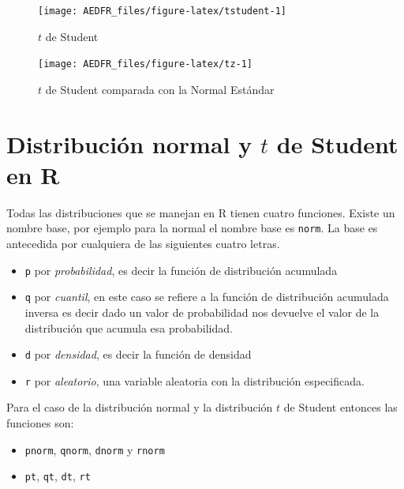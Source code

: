 \documentclass[letterpaper,]{book}
\providecommand{\tightlist}{%
  \setlength{\itemsep}{0pt}\setlength{\parskip}{0pt}}
\begin{document}
\begin{figure}[h!]

{\centering \texttt{[image: AEDFR\_files/figure-latex/tstudent-1]} 

}

\caption{$t$ de Student}\label{fig:tstudent}
\end{figure}

\begin{figure}[h!]

{\centering \texttt{[image: AEDFR\_files/figure-latex/tz-1]} 

}

\caption{$t$ de Student comparada con la Normal Estándar}\label{fig:tz}
\end{figure}

\hypertarget{distribucion-normal-y-t-de-student-en-r}{%
\section{\texorpdfstring{Distribución normal y \(t\) de Student en R}{Distribución normal y t de Student en R}}\label{distribucion-normal-y-t-de-student-en-r}}

Todas las distribuciones que se manejan en R tienen cuatro funciones. Existe un nombre base, por ejemplo para la normal el nombre base es \texttt{norm}. La base es antecedida por cualquiera de las siguientes cuatro letras.

\begin{itemize}
\tightlist
\item
  \texttt{p} por \emph{probabilidad}, es decir la función de distribución acumulada
\item
  \texttt{q} por \emph{cuantil}, en este caso se refiere a la función de distribución acumulada inversa es decir dado un valor de probabilidad nos devuelve el valor de la distribución que acumula esa probabilidad.
\item
  \texttt{d} por \emph{densidad}, es decir la función de densidad
\item
  \texttt{r} por \emph{aleatorio}, una variable aleatoria con la distribución especificada.
\end{itemize}

Para el caso de la distribución normal y la distribución \(t\) de Student entonces las funciones son:

\begin{itemize}
\tightlist
\item
  \texttt{pnorm}, \texttt{qnorm}, \texttt{dnorm} y \texttt{rnorm}
\item
  \texttt{pt}, \texttt{qt}, \texttt{dt}, \texttt{rt}
\end{itemize}
\end{document}
